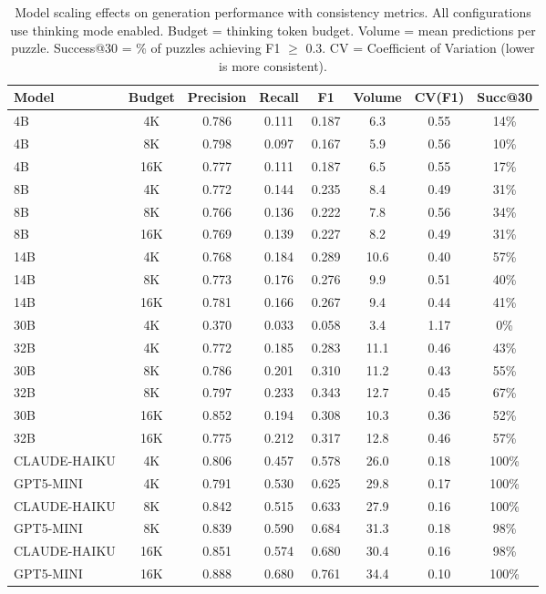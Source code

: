 




\begin{table}[t]
\centering
\small
\caption{Model scaling effects on generation performance with consistency metrics. All configurations use thinking mode enabled. Budget = thinking token budget. Volume = mean predictions per puzzle. Success@30 = \% of puzzles achieving F1 $\geq$ 0.3. CV = Coefficient of Variation (lower is more consistent).}
\label{tab:model_scaling}
\begin{tabular}{lccccccc}
\toprule
\textbf{Model} & \textbf{Budget} & \textbf{Precision} & \textbf{Recall} & \textbf{F1} & \textbf{Volume} & \textbf{CV(F1)} & \textbf{Succ@30} \\
\midrule
4B  & 4K   & 0.786 & 0.111 & 0.187 & 6.3 & 0.55 & 14\% \\
4B  & 8K   & 0.798 & 0.097 & 0.167 & 5.9 & 0.56 & 10\% \\
4B  & 16K  & 0.777 & 0.111 & 0.187 & 6.5 & 0.55 & 17\% \\
8B  & 4K   & 0.772 & 0.144 & 0.235 & 8.4 & 0.49 & 31\% \\
8B  & 8K   & 0.766 & 0.136 & 0.222 & 7.8 & 0.56 & 34\% \\
8B  & 16K  & 0.769 & 0.139 & 0.227 & 8.2 & 0.49 & 31\% \\
14B & 4K   & 0.768 & 0.184 & 0.289 & 10.6 & 0.40 & 57\% \\
14B & 8K   & 0.773 & 0.176 & 0.276 & 9.9 & 0.51 & 40\% \\
14B & 16K  & 0.781 & 0.166 & 0.267 & 9.4 & 0.44 & 41\% \\
30B & 4K   & 0.370 & 0.033 & 0.058 & 3.4 & 1.17 & 0\% \\
32B & 4K   & 0.772 & 0.185 & 0.283 & 11.1 & 0.46 & 43\% \\
30B & 8K   & 0.786 & 0.201 & 0.310 & 11.2 & 0.43 & 55\% \\
32B & 8K   & 0.797 & 0.233 & 0.343 & 12.7 & 0.45 & 67\% \\
30B & 16K  & 0.852 & 0.194 & 0.308 & 10.3 & 0.36 & 52\% \\
32B & 16K  & 0.775 & 0.212 & 0.317 & 12.8 & 0.46 & 57\% \\
CLAUDE-HAIKU & 4K   & 0.806 & 0.457 & 0.578 & 26.0 & 0.18 & 100\% \\
GPT5-MINI & 4K   & 0.791 & 0.530 & 0.625 & 29.8 & 0.17 & 100\% \\
CLAUDE-HAIKU & 8K   & 0.842 & 0.515 & 0.633 & 27.9 & 0.16 & 100\% \\
GPT5-MINI & 8K   & 0.839 & 0.590 & 0.684 & 31.3 & 0.18 & 98\% \\
CLAUDE-HAIKU & 16K  & 0.851 & 0.574 & 0.680 & 30.4 & 0.16 & 98\% \\
GPT5-MINI & 16K  & 0.888 & 0.680 & 0.761 & 34.4 & 0.10 & 100\% \\
\bottomrule
\end{tabular}
\end{table}
